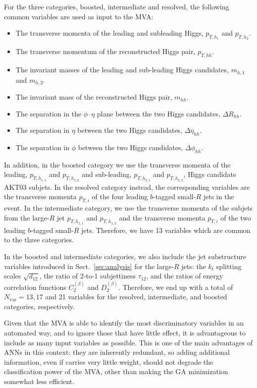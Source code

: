 For the three categories, boosted, intermediate and resolved,
the following common variables are used as input to the MVA:
\begin{itemize}
\item The transverse momenta of the leading and subleading Higgs, $p_{T,h_1}$ and $p_{T,h_2}$.
\item The transverse momentum of the reconstructed Higgs pair, $p_{T,hh}$.
\item The invariant masses of the leading and sub-leading Higgs candidates, $m_{h,1}$ and $m_{h,2}$.
\item The invariant mass of the reconstructed Higgs pair, $m_{hh}$.
\item The separation in the $\phi$--$\eta$ plane
  between the two Higgs candidates, $\Delta R_{hh}$.
  \item The separation in $\eta$  between the two Higgs candidates, $\Delta \eta_{hh}$.
\item The separation in $\phi$  between the two Higgs candidates, $\Delta \phi_{hh}$.
\end{itemize}
In addition, in the boosted category we use
  the transverse momenta of the leading, $p_{T,h_{1,1}}$ and $p_{T,h_{1,2}}$ and
  sub-leading, $p_{T,h_{2,1}}$ and $p_{T,h_{2,2}}$, Higgs candidate AKT03 subjets.
  In the resolved category instead,
  the corresponding variables are
  the transverse momenta $p_{T,i}$ of the four leading 
  $b$-tagged small-$R$ jets in the event.
  In the intermediate category, we use the
  transverse momenta of the subjets
  from the large-$R$ jet $p_{T,h_{1,1}}$ and $p_{T,h_{1,2}}$ and the
 transverse momenta $p_{T,i}$ of the two leading 
  $b$-tagged small-$R$ jets.
 Therefore, we have 13 variables which are common to the three categories.

 In the boosted and intermediate categories, we also include the jet substructure
 variables introduced in Sect.~\ref{sec:analysis} for the
 large-$R$ jets: the $k_t$ splitting scales
 $\sqrt{d_{12}}$, the ratio of 2-to-1 subjettiness $\tau_{12}$,
 and the ratios of energy correlation functions $C^{(\beta)}_2$ and
 $D_2^{(\beta)}$.
 Therefore, we end up with
 a total of $N_{\mathrm{var}}=13,17$ and 21 variables for the
resolved, intermediate, and boosted categories, respectively.


Given that the MVA is able to identify the most discriminatory variables
in an automated way,
and to ignore those that have little effect, it is advantageous to
include as many input variables as possible.
%
This is one of the main advantages of ANNs in this context: they are
inherently redundant, so
adding additional information, even if carries very little weight,
should not degrade
the classification power of the MVA, other than making the GA
minimization somewhat less efficient.

